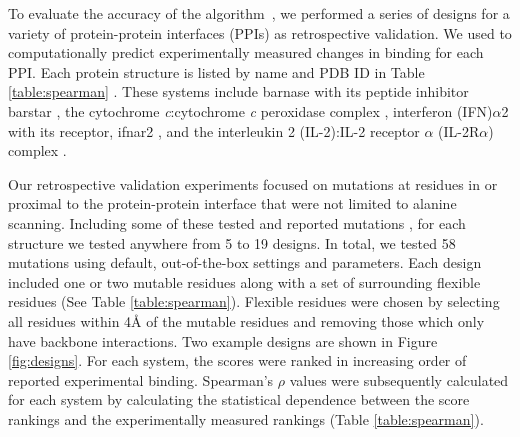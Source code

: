 To evaluate the accuracy of the \osprey \ks algorithm~\cite{K*}, we performed a series of designs for a variety of protein-protein interfaces (PPIs) as retrospective validation. We used \ks to computationally predict experimentally measured changes in binding for each PPI. Each protein structure is listed by name and PDB ID in Table \ref{table:spearman} \cite{pdb1x1u,pdb2pcb,pdb3s9d,pdb2b5i}.  These systems include barnase with its peptide inhibitor barstar \cite{binding2barnase,bindingbarnase}, the cytochrome {\it c}:cytochrome {\it c} peroxidase complex \cite{bindingcytc}, interferon (IFN)$\alpha$2 with its receptor, ifnar2  \cite{bindingifna2}, and the interleukin 2 (IL-2):IL-2 receptor $\alpha$ (IL-2R$\alpha$) complex \cite{bindingil2}.

Our retrospective validation experiments focused on mutations at residues in or proximal to the protein-protein interface that were not limited to alanine scanning. Including some of these tested and reported mutations \cite{binding2barnase,bindingbarnase,bindingcytc,bindingifna2,bindingil2}, for each structure we tested anywhere from 5 to 19 designs. In total, we tested 58 mutations using default, out-of-the-box \osprey settings and parameters. Each design included one or two mutable residues along with a set of surrounding flexible residues (See Table \ref{table:spearman}). Flexible residues were chosen by selecting all residues within 4{\AA} of the mutable residues and removing those which only have backbone interactions. Two example designs are shown in Figure \ref{fig:designs}. For each system, the \ks scores were ranked in increasing order of reported experimental binding. Spearman's $\rho$ values were subsequently calculated for each system by calculating the statistical dependence between the \ks score rankings and the experimentally measured rankings (Table \ref{table:spearman}). 

